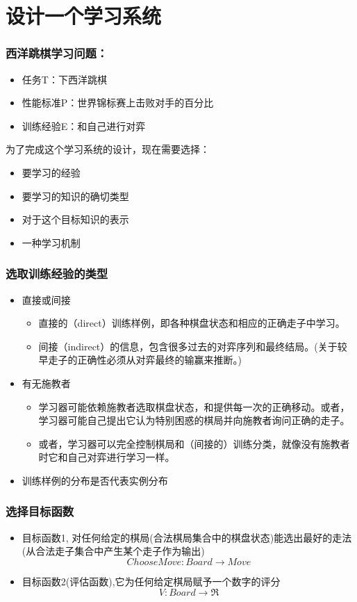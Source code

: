 \documentclass{beamer}
\begin{document}
\section{设计一个学习系统}
\label{sec-4}
\begin{frame}
\frametitle{西洋跳棋学习问题：}
\label{sec-4-1}

\begin{itemize}
\item 任务T：下西洋跳棋
\item 性能标准P：世界锦标赛上击败对手的百分比
\item 训练经验E：和自己进行对弈
\end{itemize}

为了完成这个学习系统的设计，现在需要选择：
\begin{itemize}
\item 要学习的经验
\item 要学习的知识的确切类型
\item 对于这个目标知识的表示
\item 一种学习机制
\end{itemize}
\end{frame}
\begin{frame}
\frametitle{选取训练经验的类型}
\label{sec-4-2}

\begin{itemize}
\item 直接或间接
\begin{itemize}
\item 直接的（direct）训练样例，即各种棋盘状态和相应的正确走子中学习。
\item 间接（indirect）的信息，包含很多过去的对弈序列和最终结局。(关于较早走子的正确性必须从对弈最终的输赢来推断。)
\end{itemize}
\item 有无施教者
\begin{itemize}
\item 学习器可能依赖施教者选取棋盘状态，和提供每一次的正确移动。或者，学习器可能自己提出它认为特别困惑的棋局并向施教者询问正确的走子。
\item 或者，学习器可以完全控制棋局和（间接的）训练分类，就像没有施教者时它和自己对弈进行学习一样。
\end{itemize}
\item 训练样例的分布是否代表实例分布
\end{itemize}
\end{frame}
\begin{frame}
\frametitle{选择目标函数}
\label{sec-4-3}

\begin{itemize}
\item 目标函数1, 对任何给定的棋局(合法棋局集合中的棋盘状态)能选出最好的走法(从合法走子集合中产生某个走子作为输出)
   $$ChooseMove: Board \rightarrow Move$$
\item 目标函数2(评估函数),它为任何给定棋局赋予一个数字的评分
  $$V: Board \rightarrow \Re$$
\end{itemize}
\end{frame}
\end{document}
